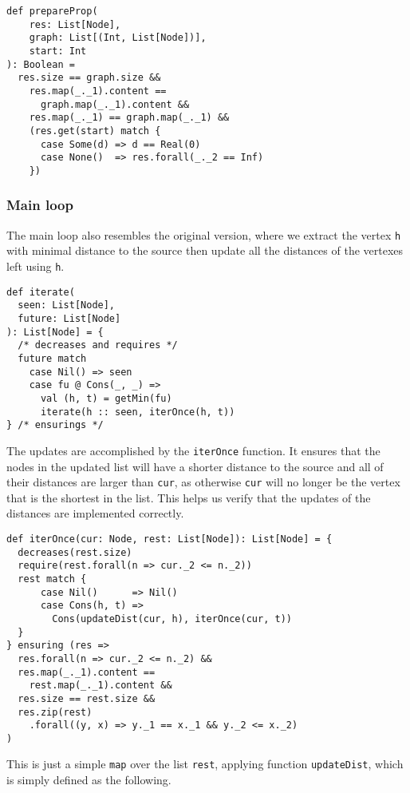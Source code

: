 \documentclass[11pt,a4paper]{article}
\begin{document}
\begin{lstlisting}
def prepareProp(
    res: List[Node],
    graph: List[(Int, List[Node])],
    start: Int
): Boolean =
  res.size == graph.size &&
    res.map(_._1).content == 
      graph.map(_._1).content &&
    res.map(_._1) == graph.map(_._1) &&
    (res.get(start) match {
      case Some(d) => d == Real(0)
      case None()  => res.forall(_._2 == Inf)
    })
\end{lstlisting}

\subsubsection{Main loop}

The main loop also resembles the original version, where we extract the vertex \texttt{h} with
minimal distance to the source then update all the distances of the vertexes left
using \texttt{h}. 

\begin{lstlisting}
def iterate(
  seen: List[Node], 
  future: List[Node]
): List[Node] = {
  /* decreases and requires */
  future match
    case Nil() => seen
    case fu @ Cons(_, _) =>
      val (h, t) = getMin(fu)
      iterate(h :: seen, iterOnce(h, t))
} /* ensurings */
\end{lstlisting}

The updates are accomplished by the \texttt{iterOnce} function. It ensures
that the nodes in the updated list will have a shorter distance to the source
and all of their distances are larger than \texttt{cur}, as otherwise \texttt{cur} 
will no longer be the vertex that is the shortest in the list. This helps us verify
that the updates of the distances are implemented correctly.

\begin{lstlisting}
def iterOnce(cur: Node, rest: List[Node]): List[Node] = {
  decreases(rest.size)
  require(rest.forall(n => cur._2 <= n._2))
  rest match {
      case Nil()      => Nil()
      case Cons(h, t) => 
        Cons(updateDist(cur, h), iterOnce(cur, t))
  }
} ensuring (res =>
  res.forall(n => cur._2 <= n._2) &&
  res.map(_._1).content == 
    rest.map(_._1).content &&
  res.size == rest.size &&
  res.zip(rest)
    .forall((y, x) => y._1 == x._1 && y._2 <= x._2)
)
\end{lstlisting}

This is just a simple \texttt{map} over the list \texttt{rest}, applying
function \texttt{updateDist}, which is simply defined as the following.
\end{document}

